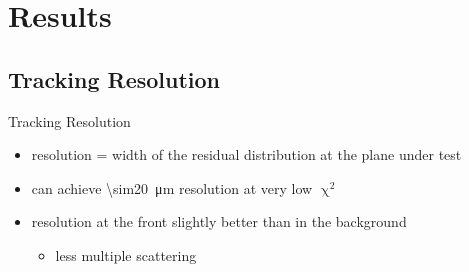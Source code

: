 \section{Results}
\subsection{Tracking Resolution}
\begin{frame}{Tracking Resolution}

	
	\begin{itemize}\itemfill
		\item resolution = width of the residual distribution at the plane under test
		\item can achieve \SI{\sim20}{\micro\meter} resolution at very low $\upchi^2$
		\item resolution at the front slightly better than in the background
		\begin{itemize}
			\item less multiple scattering
		\end{itemize}

	\end{itemize}
		
\end{frame}
